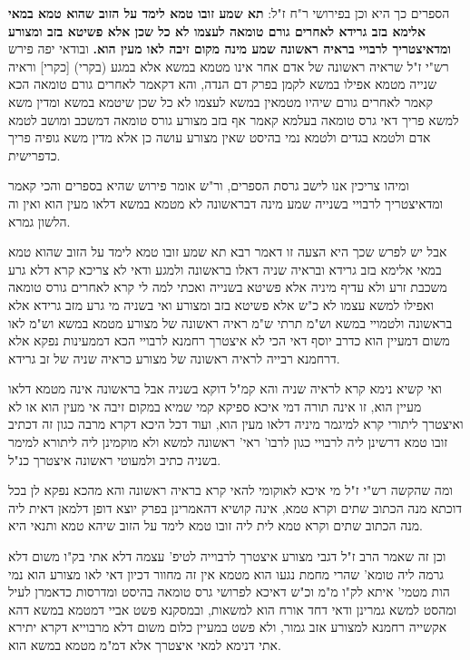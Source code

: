 \documentclass[12pt, openany]{book}
\begin{document}
{ הספרים כך היא וכן בפירושי ר"ח ז"ל: \textbf{תא שמע זובו טמא לימד על הזוב שהוא טמא במאי אלימא בזב גרידא לאחרים גורם טומאה לעצמו לא כל שכן אלא פשיטא בזב ומצורע ומדאיצטריך לרבויי בראיה ראשונה שמע מינה מקום זיבה לאו מעין הוא.}  ובודאי יפה פירש רש"י ז"ל שראיה ראשונה של אדם אחר אינו מטמא במשא אלא במגע (בקרי) [כקרי] וראיה שנייה מטמא אפילו במשא לקמן בפרק דם הנדה, והא דקאמר לאחרים גורם טומאה הכא קאמר לאחרים גורם שיהיו מטמאין במשא לעצמו לא כל שכן שיטמא במשא ומדין משא למשא פריך דאי גרס טומאה בעלמא קאמר אף בזב מצורע גורס טומאה דמשכב ומושב לטמא אדם ולטמא בגדים ולטמא נמי בהיסט שאין מצורע עושה כן אלא מדין משא גופיה פריך כדפרישית.\par  ומיהו צריכין אנו לישב גרסת הספרים, ור"ש אומר פירוש שהיא בספרים והכי קאמר ומדאיצטריך לרבויי בשנייה שמע מינה דבראשונה לא מטמא במשא דלאו מעין הוא ואין וה הלשון גמרא.\par  אבל יש לפרש שכך היא הצעה זו דאמר רבא תא שמע זובו טמא לימד על הזוב שהוא טמא במאי אלימא בזב גרידא ובראיה שניה דאלו בראשונה ולמגע ודאי לא צריכא קרא דלא גרע משכבת זרע ולא עדיף מיניה אלא פשיטא בשנייה ואכתי למה לי קרא לאחרים גורס טומאה ואפילו למשא עצמו לא כ"ש אלא פשיטא בזב ומצורע ואי בשניה מי גרע מזב גרידא אלא בראשונה ולטמויי במשא וש"מ תרתי ש"מ ראיה ראשונה של מצורע מטמא במשא וש"מ לאו משום דמעיין הוא כדרב יוסף דאי הכי לא איצטרך רחמנא לרבויי הכא דממעינות נפקא אלא דרחמנא רבייה לראיה ראשונה של מצורע כראיה שניה של זב גרידא.\par ואי קשיא נימא קרא לראיה שניה והא קמ"ל דוקא בשניה אבל בראשונה אינה מטמא דלאו מעיין הוא, זו אינה תורה דמי איכא ספיקא קמי שמיא במקום זיבה אי מעין הוא או לא ואיצטרך ליתורי קרא למיגמר מיניה דלאו מעין הוא, ועוד דכל היכא דקרא מרבה כגון זה דכתיב זובו טמא דרשינן ליה לרבויי כגון לרבו' ראי' ראשונה למשא ולא מוקמינן ליה ליתורא למימר בשניה כתיב ולמעוטי ראשונה איצטרך כנ"ל.\par ומה שהקשה רש"י ז"ל מי איכא לאוקומי להאי קרא בראיה ראשונה והא מהכא נפקא לן בכל דוכתא מנה הכתוב שתים וקרא טמא, אינה קושיא דהאמרינן בפרק יוצא דופן דלמאן דאית ליה מנה הכתוב שתים וקרא טמא לית ליה זובו טמא לימד על הזוב שיהא טמא ותנאי היא.\par וכן זה שאמר הרב ז"ל דגבי מצורע איצטרך לרבוייה לטיפ' עצמה דלא אתי בק"ו משום דלא גרמה ליה טומא' שהרי מחמת נגעו הוא מטמא אין זה מחוור דכיון דאי לאו מצורע הוא נמי הות מטמי' איתא לק"ו מ"מ וכ"ש דאיכא לפרושי גרס טומאה בהיסט ומדרסות כדאמרן לעיל ומהסט למשא גמרינן ודאי דחד אורח הוא למשאות, ובמסקנא פשט אביי דמטמא במשא דהא אקשייה רחמנא למצורע אזב גמור, ולא פשט במעיין כלום משום דלא מרבוייא דקרא יתירא אתי דנימא למאי איצטרך אלא דמ"מ מטמא במשא הוא. 
\par}
\end{document}
